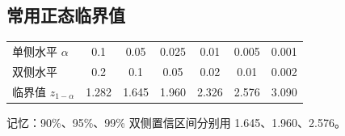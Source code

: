 \subsection{常用正态临界值}
\begin{center}\small{}\label{tab:zcrit}
\begin{tabular}{lcccccc}\toprule
单侧水平 $\alpha$ & 0.1 & 0.05 & 0.025 & 0.01 & 0.005 & 0.001\\
双侧水平 & 0.2 & 0.1 & 0.05 & 0.02 & 0.01 & 0.002\\\midrule
临界值 $z_{1-\alpha}$ & 1.282 & 1.645 & 1.960 & 2.326 & 2.576 & 3.090\\\bottomrule
\end{tabular}\end{center}
记忆：90\%、95\%、99\% 双侧置信区间分别用 1.645、1.960、2.576。
